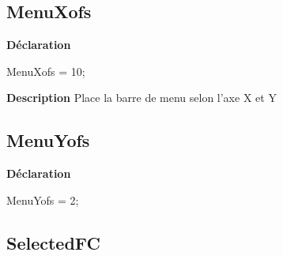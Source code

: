 \documentclass{report}
\newif\ifpdf
\begin{document}
\subsection*{MenuXofs}
\fi
\label{LesMenus-MenuXofs}
\begin{list}{}{
\setlength{\itemindent}{0cm}
\setlength{\listparindent}{0cm}
\setlength{\leftmargin}{\evensidemargin}
\addtolength{\leftmargin}{\tmplength}
\settowidth{\labelsep}{X}
\addtolength{\leftmargin}{\labelsep}
\setlength{\labelwidth}{\tmplength}
}
\item[\textbf{Déclaration}\hfill]
\ifpdf
\begin{flushleft}
\fi
\begin{ttfamily}
MenuXofs = 10;\end{ttfamily}

\ifpdf
\end{flushleft}
\fi

\par
\item[\textbf{Description}]
Place la barre de menu selon l'axe X et Y

\end{list}
\ifpdf
\subsection*{\large{\textbf{MenuYofs}}\normalsize\hspace{1ex}\hrulefill}
\else
\subsection*{MenuYofs}
\fi
\label{LesMenus-MenuYofs}
\begin{list}{}{
\setlength{\itemindent}{0cm}
\setlength{\listparindent}{0cm}
\setlength{\leftmargin}{\evensidemargin}
\addtolength{\leftmargin}{\tmplength}
\settowidth{\labelsep}{X}
\addtolength{\leftmargin}{\labelsep}
\setlength{\labelwidth}{\tmplength}
}
\item[\textbf{Déclaration}\hfill]
\ifpdf
\begin{flushleft}
\fi
\begin{ttfamily}
MenuYofs = 2;\end{ttfamily}

\ifpdf
\end{flushleft}
\fi

\end{list}
\ifpdf
\subsection*{\large{\textbf{SelectedFC}}\normalsize\hspace{1ex}\hrulefill}
\else
\end{document}
